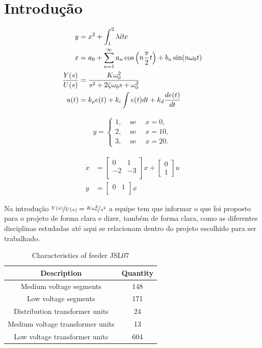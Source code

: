 
\section{Introdução}

\begin{align}
    y &= x^{2} +\int_{1}^{2} \lambda \partial x \\
    x &= a_{0} + \sum_{n=1}^{\infty} a_{n} \cos\left(n\frac{\pi}{2} t\right) +b_{n} \sin(n\omega_0 t) \notag \\
    \frac{Y(s)}{U(s)} &= \frac{K\omega_0^2}{s^2 +2\zeta\omega_0 s +\omega_0^2} \\
    u(t) &= k_p e(t) +k_i\int e(t) dt +k_d \frac{de(t)}{dt} \label{eq:one}
\end{align}


\begin{align}
     y=\begin{cases}
 1, & \text{ se }\quad x= 0,\\
 2, & \text{ se }\quad x= 10,\\
 3, & \text{ se }\quad x= 20.
\end{cases}
\end{align}

\begin{align}
    \dot{x} &= \begin{bmatrix}
0 & 1 \\
-2 & -3 \\
\end{bmatrix} x + \begin{bmatrix}
0 \\
1
\end{bmatrix} u \\
y &= \begin{bmatrix}
0 & 1 \\
\end{bmatrix} x
\end{align}





Na introdução $\nicefrac{Y(s)}{U(s)} = \nicefrac{K\omega_0^2}{s^2}$ a equipe tem que informar o que foi proposto para o projeto de forma clara e dizer, também de forma clara, como as diferentes disciplinas estudadas até aqui se relacionam dentro do projeto escolhido para ser trabalhado. 

\begin{table}[H]
  \centering
  \caption{Characteristics of feeder JSL07}
    \begin{tabular}{cc}
    \toprule
    \textbf{Description} & \textbf{Quantity} \\
    \midrule
    Medium voltage segments & 148 \\
    Low voltage segments & 171 \\
    Distribution transformer units & 24 \\
    Medium voltage transformer units & 13 \\
    Low voltage transformer units & 604 \\
    \bottomrule
    \end{tabular}%
  \label{tab:jsl07}%
\end{table}%

